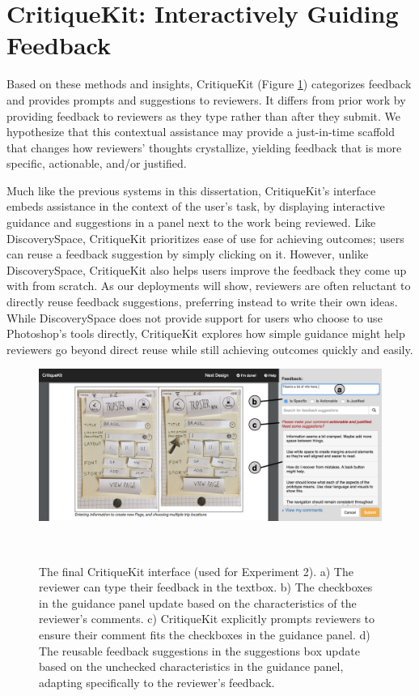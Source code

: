 \section{CritiqueKit: Interactively Guiding Feedback}
Based on these methods and insights, CritiqueKit (Figure \ref{fig:critiquekit_interface}) categorizes feedback and provides prompts and suggestions to reviewers. It differs from prior work by providing feedback to reviewers as they type rather than after they submit. We hypothesize that this contextual assistance may provide a just-in-time scaffold that changes how reviewers' thoughts crystallize, yielding feedback that is more specific, actionable, and/or justified. 

Much like the previous systems in this dissertation, CritiqueKit's interface embeds assistance in the context of the user's task, by displaying interactive guidance and suggestions in a panel next to the work being reviewed. Like DiscoverySpace, CritiqueKit prioritizes ease of use for achieving outcomes; users can reuse a feedback suggestion by simply clicking on it. However, unlike DiscoverySpace, CritiqueKit also helps users improve the feedback they come up with from scratch. As our deployments will show, reviewers are often reluctant to directly reuse feedback suggestions, preferring instead to write their own ideas. While DiscoverySpace does not provide support for users who choose to use Photoshop's tools directly, CritiqueKit explores how simple guidance might help reviewers go beyond direct reuse while still achieving outcomes quickly and easily.

\begin{figure}[b!]
\centering
  \includegraphics[width=\textwidth]{critiquekit/figures/interface.png}
  \caption[The final CritiqueKit interface (used for Experiment 2).]{The final CritiqueKit interface (used for Experiment 2). a) The reviewer can type their feedback in the textbox. b) The checkboxes in the guidance panel update based on the characteristics of the reviewer’s comments. c) CritiqueKit explicitly prompts reviewers to ensure their comment fits the checkboxes in the guidance panel. d) The reusable feedback suggestions in the suggestions box update based on the unchecked characteristics in the guidance panel, adapting specifically to the reviewer's feedback.}~\label{fig:critiquekit_interface}
\end{figure}

